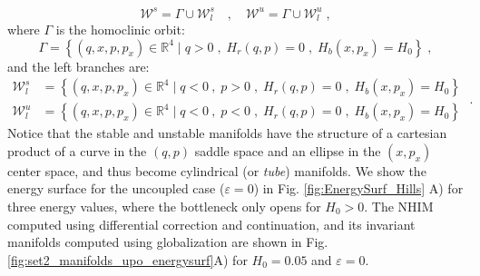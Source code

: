 \documentclass[8pt]{article}
\begin{document}
\begin{equation}
\mathcal{W}^s = \Gamma \cup \mathcal{W}^s_l \quad , \quad \mathcal{W}^u = \Gamma \cup \mathcal{W}^u_l \;,
\end{equation}
where $\Gamma$ is the homoclinic orbit:
\begin{equation}
\Gamma = \left\{  (q,x,p,p_x) \in \mathbb{R}^4 \; | \; q > 0 \;,\; H_r(q,p) = 0 \;,\; H_b(x,p_x) = H_0 \right\} \;,
\end{equation}
and the left branches are:
\begin{equation}
\begin{split}
\mathcal{W}^s_l &= \left\{ (q,x,p,p_x) \in \mathbb{R}^4 \; | \; q < 0 \:,\; p > 0 \;,\; H_r(q,p) = 0 \;,\; H_b(x,p_x) = H_0 \right\} \\[.2cm]
\mathcal{W}^u_l &= \left\{ (q,x,p,p_x) \in \mathbb{R}^4 \; | \; q < 0 \:,\; p < 0 \;,\; H_r(q,p) = 0 \;,\; H_b(x,p_x) = H_0 \right\}
\end{split}
\;.
\end{equation}
Notice that the stable and unstable manifolds have the structure of a cartesian product of a curve in the $(q,p)$ saddle space and an ellipse in the $(x,p_x)$ center space, and thus become cylindrical (or \textit{tube}) manifolds. We show the energy surface for the uncoupled case ($\varepsilon = 0$) in Fig. \ref{fig:EnergySurf_Hills} A) for three energy values, where the bottleneck only opens for $H_0 > 0$. The NHIM computed using differential correction and continuation, and its invariant manifolds computed using globalization are shown in Fig. \ref{fig:set2_manifolds_upo_energysurf}A) for $H_0 = 0.05$ and $\varepsilon = 0$. 
\end{document}
